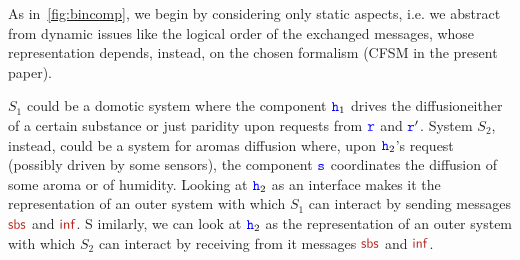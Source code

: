 As in~\cref{fig:bincomp}, we begin by considering only static aspects, i.e. we abstract from dynamic issues like the logical order of the exchanged messages, whose representation depends, instead, on the chosen formalism (CFSM in the present paper).
 \begin{figure}[h]
\end{figure}

\noindent
$S_1$ could be a domotic system where the component ${\mathtt{\color{blue}{ {h}}}}_1$ drives the diffusioneither of a certain substance or just paridity upon requests from ${\mathtt{\color{blue}{ {r}}}}$ and ${\mathtt{\color{blue}{ {r}}}}'$.
System $S_2$, instead, could be a system for aromas diffusion where, upon ${\mathtt{\color{blue}{ {h}}}}_2$'s request
(possibly driven by some sensors), 
the component ${\mathtt{\color{blue}{ {s}}}}$ coordinates the diffusion of some aroma or of humidity.  
 Looking at ${\mathtt{\color{blue}{ {h}}}}_2$ as an interface makes it the representation of an outer system with which
 $S_1$ can interact by sending messages $\msg[sbs]$ and $\msg[inf]$. S
 imilarly, we can look at ${\mathtt{\color{blue}{ {h}}}}_2$ as the
 representation of an outer system with which
 $S_2$ can interact by receiving from it messages $\msg[sbs]$ and $\msg[inf]$.
 
